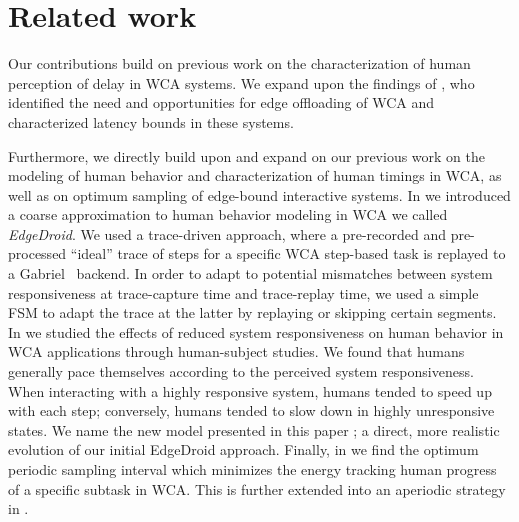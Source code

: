 \section{Related work}\label{sec:relwork}

Our contributions build on previous work on the characterization of human perception of delay in \ac{WCA} systems.
We expand upon the findings of \textcite{Ha2014towards,Chen2017Empirical}, who identified the need and opportunities for edge offloading of \ac{WCA} and characterized latency bounds in these systems.

Furthermore, we directly build upon and expand on our previous work on the modeling of human behavior and characterization of human timings in \ac{WCA}, as well as on optimum sampling of edge-bound interactive systems.
In \textcite{olguin2018scaling,olguin2019edgedroid} we introduced a coarse approximation to human behavior modeling in \ac{WCA} we called \emph{EdgeDroid}.
We used a trace-driven approach, where a pre-recorded and pre-processed ``ideal'' trace of steps for a specific \ac{WCA} step-based task is replayed to a Gabriel~\cite{Chen2018application} backend.
In order to adapt to potential mismatches between system responsiveness at trace-capture time and trace-replay time, we used a simple \ac{FSM} to adapt the trace at the latter by replaying or skipping certain segments.
In \textcite{olguinmunoz:impact2021} we studied the effects of reduced system responsiveness on human behavior in \ac{WCA} applications through human-subject studies.
We found that humans generally pace themselves according to the perceived system responsiveness.
When interacting with a highly responsive system, humans tended to speed up with each step; conversely, humans tended to slow down in highly unresponsive states.
We name the new model presented in this paper \emph{\edgedroid}; a direct, more realistic evolution of our initial EdgeDroid approach.
Finally, in \textcite{Moothedath2021EnergyOptimal,Moothedath2022EnergyEfficient} we find the optimum periodic sampling interval which minimizes the energy tracking human progress of a specific subtask in \ac{WCA}.
This is further extended into an aperiodic strategy in \textcite{Moothedath2022Aperiodic}.

